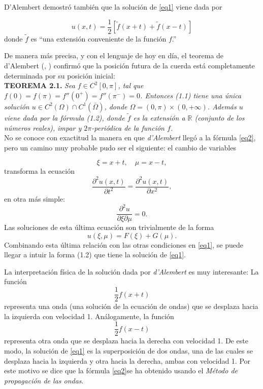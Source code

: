 D'Alembert demostró también que la solución de \ref{eq1} viene dada por

\begin{equation}\label{eq2}
	u(x,t) = \frac{1}{2} \left[ \tilde{f}(x+t) + \tilde{f}(x-t) \right]
\end{equation}
donde $\tilde{f}$ es ``una extensión conveniente de la función $f$.''

De manera más precisa, y con el lenguaje de hoy en día, el teorema de d'Alembert (\cite{[25]}, \cite{[27]}) confirmó que la posición futura de la cuerda está completamente determinada por su posición inicial: \\[0.3cm]

\textbf{TEOREMA 2.1.} \textit{Sea $f \in C^2 [0, \pi]$, tal que $f(0) = f(\pi) = f''(0^+) = f''(\pi^-) = 0$. Entonces (1.1) tiene una única solución $u \in C^2(\Omega) \cap C^1(\bar{\Omega})$, donde $\Omega = (0, \pi) \times (0, +\infty)$. Además $u$ viene dada por la fórmula (1.2), donde $\tilde{f}$ es la extensión a $\mathbb{R}$ (conjunto de los números reales), impar y $2\pi$-periódica de la función $f$.} \\[0.3cm]


No se conoce con exactitud la manera en que \textit{d’Alembert} llegó a la fórmula \ref{eq2}, pero un camino muy probable pudo ser el siguiente: el cambio de variables

\[
\xi = x+t, \quad \mu = x-t,
\]
transforma la ecuación 
\[
\frac{\partial^2 u(x,t)}{\partial t^2} = \frac{\partial^2 u(x,t)}{\partial x^2},
\]
en otra más simple:
\[
\frac{\partial^2 u}{\partial \xi \partial \mu} = 0.
\]
Las soluciones de esta última ecuación son trivialmente de la forma 
\[
u(\xi, \mu) = F(\xi) + G(\mu).
\]
Combinando esta última relación con las otras condiciones en \ref{eq1}, se puede llegar a intuir la forma (1.2) que tiene la solución de \ref{eq1}.

La interpretación física de la solución dada por \textit{d’Alembert} es muy interesante: La función \[
\frac{1}{2} f(x+t)
\]
representa una onda (una solución de la ecuación de ondas) que se desplaza hacia la izquierda con velocidad 1. Análogamente, la función
\[
\frac{1}{2} f(x-t)
\]
representa otra onda que se desplaza hacia la derecha con velocidad 1. De este modo, la solución de \ref{eq1} es la superposición de dos ondas, una de las cuales se desplaza hacia la izquierda y otra hacia la derecha, ambas con velocidad 1. Por este motivo se dice que la fórmula \ref{eq2}se ha obtenido usando el \textit{Método de propagación de las ondas}.\\[0.3cm]



